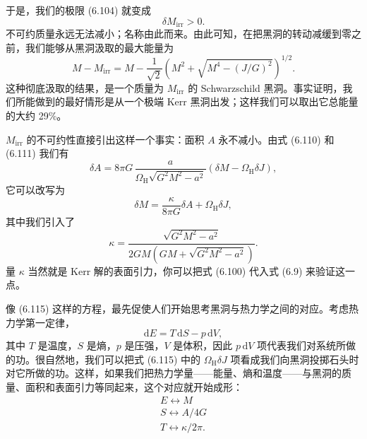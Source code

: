 
于是，我们的极限 (6.104) 就变成
\begin{equation*}
\delta M_{\mathrm{irr}} > 0.
\tag{6.112}
\end{equation*}
不可约质量永远无法减小；名称由此而来。由此可知，在把黑洞的转动减缓到零之前，我们能够从黑洞汲取的最大能量为
\begin{equation*}
M - M_{\mathrm{irr}} = M - \frac{1}{\sqrt{2}}\left(M^{2}+\sqrt{M^{4}-(J/G)^{2}}\right)^{1/2}.
\tag{6.113}
\end{equation*}
这种彻底汲取的结果，是一个质量为 $M_{\mathrm{irr}}$ 的 Schwarzschild 黑洞。事实证明，我们所能做到的最好情形是从一个极端 Kerr 黑洞出发；这样我们可以取出它总能量的大约 29\%。

$M_{\mathrm{irr}}$ 的不可约性直接引出这样一个事实：面积 $A$ 永不减小。由式 (6.110) 和 (6.111) 我们有
\begin{equation*}
\delta A = 8\pi G\,\frac{a}{\Omega_{\mathrm{H}}\sqrt{G^{2}M^{2}-a^{2}}}\left(\delta M - \Omega_{\mathrm{H}}\delta J\right),
\tag{6.114}
\end{equation*}
它可以改写为
\begin{equation*}
\delta M = \frac{\kappa}{8\pi G}\delta A + \Omega_{\mathrm{H}}\delta J,
\tag{6.115}
\end{equation*}
其中我们引入了
\begin{equation*}
\kappa = \frac{\sqrt{G^{2}M^{2}-a^{2}}}{2GM\left(GM+\sqrt{G^{2}M^{2}-a^{2}}\right)}.
\tag{6.116}
\end{equation*}
量 $\kappa$ 当然就是 Kerr 解的表面引力，你可以把式 (6.100) 代入式 (6.9) 来验证这一点。

像 (6.115) 这样的方程，最先促使人们开始思考黑洞与热力学之间的对应。考虑热力学第一定律，
\begin{equation*}
\mathrm{d}E = T\,\mathrm{d}S - p\,\mathrm{d}V,
\tag{6.117}
\end{equation*}
其中 $T$ 是温度，$S$ 是熵，$p$ 是压强，$V$ 是体积，因此 $p\,\mathrm{d}V$ 项代表我们对系统所做的功。很自然地，我们可以把式 (6.115) 中的 $\Omega_{\mathrm{H}}\delta J$ 项看成我们向黑洞投掷石头时对它所做的功。这样，如果我们把热力学量——能量、熵和温度——与黑洞的质量、面积和表面引力等同起来，这个对应就开始成形：
\begin{gather*}
E \leftrightarrow M\\
S \leftrightarrow A/4G\\
T \leftrightarrow \kappa/2\pi.
\tag{6.118}
\end{gather*}

